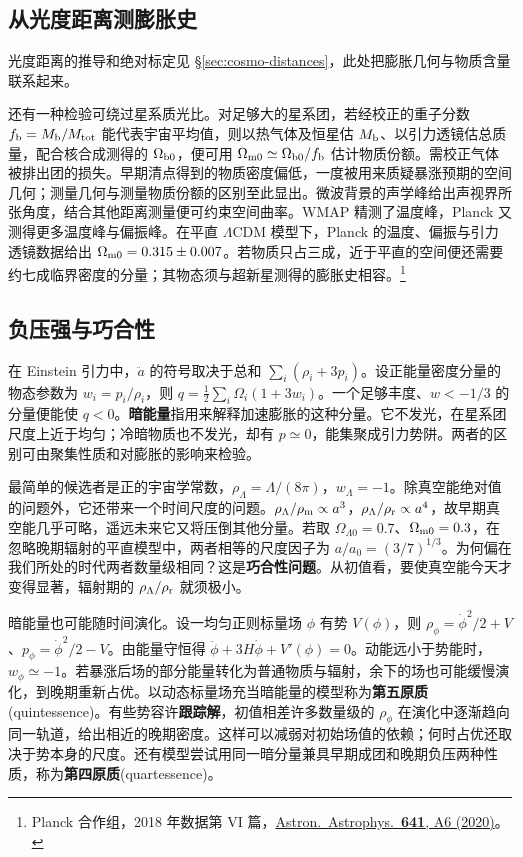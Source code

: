 \subsection{从光度距离测膨胀史}

光度距离的推导和绝对标定见 \S\ref{sec:cosmo-distances}，此处把膨胀几何与物质含量联系起来。

还有一种检验可绕过星系质光比。对足够大的星系团，若经校正的重子分数 $f_{\rm b}=M_{\rm b}/M_{\rm tot}$ 能代表宇宙平均值，则以热气体及恒星估 $M_{\rm b}$、以引力透镜估总质量，配合核合成测得的 $\Omega_{\rm b0}$，便可用 $\Omega_{\rm m0}\simeq\Omega_{\rm b0}/f_{\rm b}$ 估计物质份额。需校正气体被排出团的损失。早期清点得到的物质密度偏低，一度被用来质疑暴涨预期的空间几何；测量几何与测量物质份额的区别至此显出。微波背景的声学峰给出声视界所张角度，结合其他距离测量便可约束空间曲率。WMAP 精测了温度峰，Planck 又测得更多温度峰与偏振峰。在平直 $\Lambda$CDM 模型下，Planck 的温度、偏振与引力透镜数据给出 $\Omega_{\rm m0}=0.315\pm0.007$。若物质只占三成，近于平直的空间便还需要约七成临界密度的分量；其物态须与超新星测得的膨胀史相容。\footnote{Planck 合作组，2018 年数据第 VI 篇，\href{https://arxiv.org/abs/1807.06209}{Astron.\ Astrophys.\ \textbf{641}, A6 (2020)}。}

\subsection{负压强与巧合性}

在 Einstein 引力中，$\ddot a$ 的符号取决于总和 $\sum_i(\rho_i+3p_i)$。设正能量密度分量的物态参数为 $w_i=p_i/\rho_i$，则 $q=\tfrac12\sum_i\Omega_i(1+3w_i)$。一个足够丰度、$w<-1/3$ 的分量便能使 $q<0$。\textbf{暗能量}指用来解释加速膨胀的这种分量。它不发光，在星系团尺度上近于均匀；冷暗物质也不发光，却有 $p\simeq0$，能集聚成引力势阱。两者的区别可由聚集性质和对膨胀的影响来检验。

最简单的候选者是正的宇宙学常数，$\rho_\Lambda=\Lambda/(8\pi)$，$w_\Lambda=-1$。除真空能绝对值的问题外，它还带来一个时间尺度的问题。$\rho_\Lambda/\rho_{\rm m}\propto a^3$，$\rho_\Lambda/\rho_{\rm r}\propto a^4$，故早期真空能几乎可略，遥远未来它又将压倒其他分量。若取 $\Omega_{\Lambda0}=0.7$、$\Omega_{\rm m0}=0.3$，在忽略晚期辐射的平直模型中，两者相等的尺度因子为 $a/a_0=(3/7)^{1/3}$。为何偏在我们所处的时代两者数量级相同？这是\textbf{巧合性问题}。从初值看，要使真空能今天才变得显著，辐射期的 $\rho_\Lambda/\rho_{\rm r}$ 就须极小。

暗能量也可能随时间演化。设一均匀正则标量场 $\phi$ 有势 $V(\phi)$，则 $\rho_\phi=\dot\phi^2/2+V$、$p_\phi=\dot\phi^2/2-V$。由能量守恒得 $\ddot\phi+3H\dot\phi+V'(\phi)=0$。动能远小于势能时，$w_\phi\simeq-1$。若暴涨后场的部分能量转化为普通物质与辐射，余下的场也可能缓慢演化，到晚期重新占优。以动态标量场充当暗能量的模型称为\textbf{第五原质}(quintessence)。有些势容许\textbf{跟踪解}，初值相差许多数量级的 $\rho_\phi$ 在演化中逐渐趋向同一轨道，给出相近的晚期密度。这样可以减弱对初始场值的依赖；何时占优还取决于势本身的尺度。还有模型尝试用同一暗分量兼具早期成团和晚期负压两种性质，称为\textbf{第四原质}(quartessence)。

